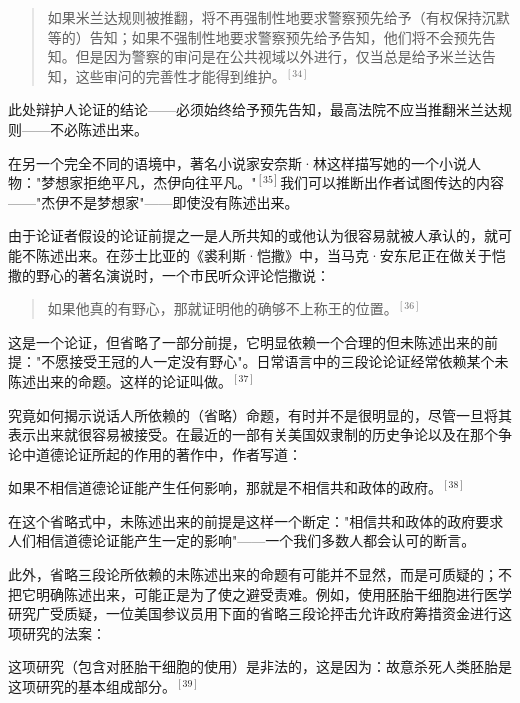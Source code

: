 \begin{quotation}
如果米兰达规则被推翻，将不再强制性地要求警察预先给予（有权保持沉默等的）告知；如果不强制性地要求警察预先给予告知，他们将不会预先告知。但是因为警察的审问是在公共视域以外进行，仅当总是给予米兰达告知，这些审问的完善性才能得到维护。${}^{[34]}$
\end{quotation}

此处辩护人论证的结论——必须始终给予预先告知，最高法院不应当推翻米兰达规则——不必陈述出来。

在另一个完全不同的语境中，著名小说家安奈斯·林这样描写她的一个小说人物："梦想家拒绝平凡，杰伊向往平凡。"${}^{[35]}$我们可以推断出作者试图传达的内容——"杰伊不是梦想家"——即使没有陈述出来。

由于论证者假设的论证前提之一是人所共知的或他认为很容易就被人承认的，就可能不陈述出来。在莎士比亚的《裘利斯·恺撒》中，当马克·安东尼正在做关于恺撒的野心的著名演说时，一个市民听众评论恺撒说：

\begin{quotation}
如果他真的有野心，那就证明他的确够不上称王的位置。${}^{[36]}$
\end{quotation}

这是一个论证，但省略了一部分前提，它明显依赖一个合理的但未陈述出来的前提："不愿接受王冠的人一定没有野心"。日常语言中的三段论论证经常依赖某个未陈述出来的命题。这样的论证叫做。${}^{[37]}$

究竟如何揭示说话人所依赖的（省略）命题，有时并不是很明显的，尽管一旦将其表示出来就很容易被接受。在最近的一部有关美国奴隶制的历史争论以及在那个争论中道德论证所起的作用的著作中，作者写道：

\begin{displayquote}
如果不相信道德论证能产生任何影响，那就是不相信共和政体的政府。${}^{[38]}$
\end{displayquote}

在这个省略式中，未陈述出来的前提是这样一个断定："相信共和政体的政府要求人们相信道德论证能产生一定的影响"——一个我们多数人都会认可的断言。

此外，省略三段论所依赖的未陈述出来的命题有可能并不显然，而是可质疑的；不把它明确陈述出来，可能正是为了使之避受责难。例如，使用胚胎干细胞进行医学研究广受质疑，一位美国参议员用下面的省略三段论抨击允许政府筹措资金进行这项研究的法案：

\begin{displayquote}
这项研究（包含对胚胎干细胞的使用）是非法的，这是因为：故意杀死人类胚胎是这项研究的基本组成部分。${}^{[39]}$
\end{displayquote}

